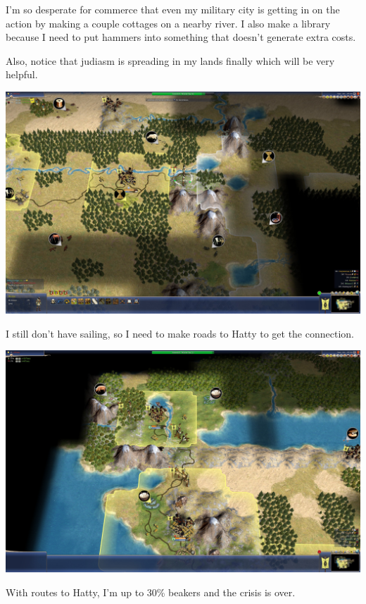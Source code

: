 \documentclass[10pt]{article}
\begin{document}
I'm so desperate for commerce that even my military city is getting in on the action by making
a couple cottages on a nearby river. I also make a library because I need to put hammers into
something that doesn't generate extra costs.

Also, notice that judiasm is spreading in my lands finally which will be very helpful.

\includegraphics[width=1.0\textwidth]{78}

I still don't have sailing, so I need to make roads to Hatty to get the connection.

\includegraphics[width=1.0\textwidth]{80}

With routes to Hatty, I'm up to 30\% beakers and the crisis is over.
\end{document}
